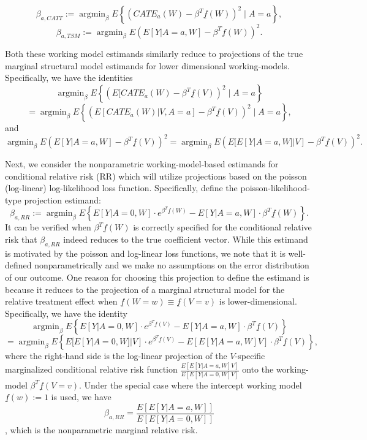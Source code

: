 \documentclass[
]{jss}
\DeclareMathOperator{\argmin}{argmin}
\begin{document}
\begin{equation}
\beta_{a,CATT} := \argmin_{\beta} E\left\{\left(CATE_a(W) - \beta^T \underline{f}(W) \right)^2 \mid A =a \right\}, \label{eqn::estimandNPCATT}
\end{equation} \begin{equation}
\beta_{a,TSM} := \argmin_{\beta} E\left(E[Y|A=a,W]- \beta^T \underline{f}(W) \right)^2.
\label{eqn::estimandNPTSM}
\end{equation}

Both these working model estimands similarly reduce to projections of
the true marginal structural model estimands for lower dimensional
working-models. Specifically, we have the identities
\[  \argmin_{\beta} E\left\{\left(E[CATE_a(W) - \beta^T \underline{f}(V)  \right)^2\mid A =a\right\} \]
\[=  \argmin_{\beta} E\left\{\left(E[CATE_a(W)|V, A=a] - \beta^T \underline{f}(V)  \right)^2\mid A =a\right\},\]
and
\[ \argmin_{\beta} E\left(E[Y|A=a,W]- \beta^T \underline{f}(V) \right)^2 =  \argmin_{\beta} E\left(E[E[Y|A=a,W]|V]- \beta^T \underline{f}(V) \right)^2.\]

Next, we consider the nonparametric working-model-based estimands for
conditional relative risk (RR) which will utilize projections based on
the poisson (log-linear) log-likelihood loss function. Specifically,
define the poisson-likelihood-type projection estimand: \begin{equation}
\beta_{a,RR} := \argmin_{\beta} E \left\{E[Y|A=0,W] \cdot e^{\beta^T \underline{f}(W)} - E[Y|A=a,W] \cdot \beta^T \underline{f}(W) \right\}.
\label{eqn::estimandNPRR}
\end{equation} It can be verified when \(\beta^T \underline{f}(W)\) is
correctly specified for the conditional relative risk that
\(\beta_{a,RR}\) indeed reduces to the true coefficient vector. While
this estimand is motivated by the poisson and log-linear loss functions,
we note that it is well-defined nonparametrically and we make no
assumptions on the error distribution of our outcome. One reason for
choosing this projection to define the estimand is because it reduces to
the projection of a marginal structural model for the relative treatment
effect when \(\underline{f}(W=w) \equiv \underline{f}(V=v)\) is
lower-dimensional. Specifically, we have the identity
\[\argmin_{\beta} E \left\{E[Y|A=0,W] \cdot e^{\beta^T \underline{f}(V)} - E[Y|A=a,W] \cdot \beta^T \underline{f}(V) \right\}\]
\[= \argmin_{\beta} E \left\{E[E[Y|A=0,W]|V] \cdot e^{\beta^T \underline{f}(V)} - E[E[Y|A=a,W]V] \cdot \beta^T \underline{f}(V) \right\},\]
where the right-hand side is the log-linear projection of the
\(V\)-specific marginalized conditional relative risk function
\(\frac{E[E[Y|A=a,W]V]}{E[E[Y|A=0,W]V]}\) onto the working-model
\(\beta^T \underline{f}(V=v)\). Under the special case where the
intercept working model \(\underline{f}(w) := 1\) is used, we have
\[\beta_{a,RR} = \frac{E[E[Y|A=a,W]]}{E[E[Y|A=0,W]]}\], which is the
nonparametric marginal relative risk.
\end{document}
